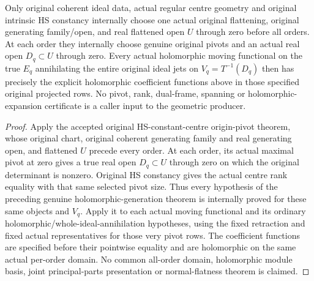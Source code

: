\begin{theorem}
\label{hir:actual-original-hs-centre-holomorphic-true-jet-dual-generation}
\leanok
Only original coherent ideal data, actual regular centre geometry and
original intrinsic HS constancy internally choose one actual original
flattening, original generating family/open, and real flattened open
$U$ through zero before all orders. At each order they internally
choose genuine original pivots and an actual real open $D_q\subset U$
through zero. Every actual holomorphic moving functional on the true
$E_q$ annihilating the entire original ideal jets on
$V_q=T^{-1}(D_q)$ then has precisely the explicit holomorphic
coefficient functions above in those specified original projected rows.
No pivot, rank, dual-frame, spanning or holomorphic-expansion certificate
is a caller input to the geometric producer.
\end{theorem}
\begin{proof}
Apply the accepted original HS-constant-centre origin-pivot theorem,
whose original chart, original coherent generating family and real
generating open, and flattened $U$ precede every order. At each order,
its actual maximal pivot at zero gives a true real open $D_q\subset U$
through zero on which the original determinant is nonzero. Original
HS constancy gives the actual centre rank equality with that same
selected pivot size. Thus every hypothesis of the preceding genuine
holomorphic-generation theorem is internally proved for these same
objects and $V_q$. Apply it to each actual moving functional and its
ordinary holomorphic/whole-ideal-annihilation hypotheses, using the
fixed retraction and fixed actual representatives for those very
pivot rows. The coefficient functions are specified before their
pointwise equality and are holomorphic on the same actual per-order
domain. No common all-order domain, holomorphic module basis, joint
principal-parts presentation or normal-flatness theorem is claimed.
\end{proof}
